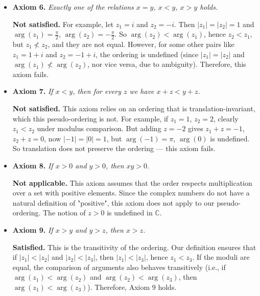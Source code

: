\begin{itemize}
\item \textbf{Axiom 6.} \emph{Exactly one of the relations \( x = y \), \( x < y \), \( x > y \) holds.}

\textbf{Not satisfied.}  
For example, let \( z_1 = i \) and \( z_2 = -i \). Then \( |z_1| = |z_2| = 1 \) and \( \arg(z_1) = \frac{\pi}{2} \), \( \arg(z_2) = -\frac{\pi}{2} \). So \( \arg(z_2) < \arg(z_1) \), hence \( z_2 < z_1 \), but \( z_1 \not< z_2 \), and they are not equal. However, for some other pairs like \( z_1 = 1 + i \) and \( z_2 = -1 + i \), the ordering is undefined (since \( |z_1| = |z_2| \) and \( \arg(z_1) \not< \arg(z_2) \), nor vice versa, due to ambiguity). Therefore, this axiom fails.

\item \textbf{Axiom 7.} \emph{If \( x < y \), then for every \( z \) we have \( x + z < y + z \).}

\textbf{Not satisfied.}  
This axiom relies on an ordering that is translation-invariant, which this pseudo-ordering is not. For example, if \( z_1 = 1 \), \( z_2 = 2 \), clearly \( z_1 < z_2 \) under modulus comparison. But adding \( z = -2 \) gives \( z_1 + z = -1 \), \( z_2 + z = 0 \), now \( |-1| = |0| = 1 \), but \( \arg(-1) = \pi \), \( \arg(0) \) is undefined. So translation does not preserve the ordering — this axiom fails.

\item \textbf{Axiom 8.} \emph{If \( x > 0 \) and \( y > 0 \), then \( xy > 0 \).}

\textbf{Not applicable.}  
This axiom assumes that the order respects multiplication over a set with positive elements. Since the complex numbers do not have a natural definition of "positive", this axiom does not apply to our pseudo-ordering. The notion of \( z > 0 \) is undefined in \( \mathbb{C} \).

\item \textbf{Axiom 9.} \emph{If \( x > y \) and \( y > z \), then \( x > z \).}

\textbf{Satisfied.}  
This is the transitivity of the ordering. Our definition ensures that if \( |z_1| < |z_2| \) and \( |z_2| < |z_3| \), then \( |z_1| < |z_3| \), hence \( z_1 < z_3 \). If the moduli are equal, the comparison of arguments also behaves transitively (i.e., if \( \arg(z_1) < \arg(z_2) \) and \( \arg(z_2) < \arg(z_3) \), then \( \arg(z_1) < \arg(z_3) \)). Therefore, Axiom 9 holds.
\end{itemize}

